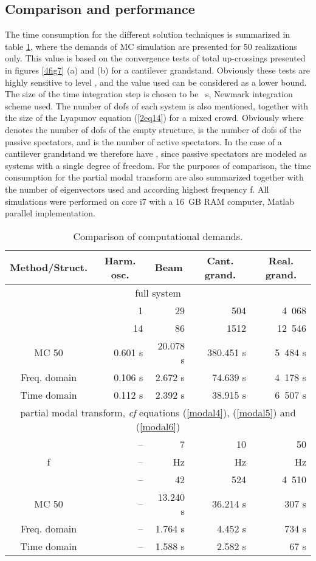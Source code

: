\documentclass[preprint,12pt,authoryear]{elsarticle}
\begin{document}
\subsection{Comparison and performance}
\label{performance}
The time consumption for the different solution techniques is summarized in table \ref{4tab2}, where the demands of MC simulation are presented for 50 realizations only. This value is based on the convergence tests of total up-crossings presented in figures \ref{4fig7} (a) and (b) for a cantilever grandstand. Obviously these tests are highly sensitive to level , and the  value used can be considered as a lower bound. The size of the time integration step is chosen to be ~s, Newmark integration scheme used. The number of dofs of each system is also mentioned, together with the size of the Lyapunov equation (\ref{2eq14})  for a mixed crowd. Obviously  where  denotes the number of dofs of the empty structure,  is the number of dofs of the passive spectators, and  is the number of active spectators. In the case of a cantilever grandstand we therefore have , since passive spectators are modeled as systems with a single degree of freedom. For the purposes of comparison, the time consumption for the partial modal transform are also summarized together with the number of eigenvectors used  and according highest frequency f. All simulations were performed on core i7 with a 16~GB RAM computer, Matlab\textsuperscript{\textregistered} parallel implementation.
\begin{table}
\centering
\caption{Comparison of computational demands.}
\begin{tabular}{|c|r|r|r|r|}\hline
	Method/Struct. & \multicolumn{1}{c|}{Harm. osc.} & \multicolumn{1}{c|}{Beam} & \multicolumn{1}{c|}{Cant. grand.} & \multicolumn{1}{c|}{Real. grand.} \\\hline
	\multicolumn{5}{|c|}{full system} \\\hline
   & 1 & 29 & 504 & 4\ 068 \\
	 & 14 & 86 & 1512 & 12\ 546 \\	
	MC 50 & 0.601 s & 20.078 s & 380.451 s & 5\ 484 s \\
	Freq. domain & 0.106 s & 2.672 s & 74.639 s & 4\ 178 s \\
	Time domain & 0.112 s & 2.392 s & 38.915 s & 6\ 507 s \\\hline
	\multicolumn{5}{|c|}{partial modal transform, \textit{cf} equations (\ref{modal4}), (\ref{modal5}) and (\ref{modal6})} \\\hline
	 & -- & 7 & 10 & 50 \\
	f & -- &  Hz &  Hz &  Hz \\
	 & -- & 42 & 524 & 4\ 510 \\
	MC 50 & -- & 13.240 s & 36.214 s & 307 s \\
	Freq. domain & -- & 1.764 s & 4.452 s & 734 s \\
	Time domain & -- & 1.588 s & 2.582 s & 67 s \\\hline
\end{tabular}
\label{4tab2}
\end{table}
\end{document}

